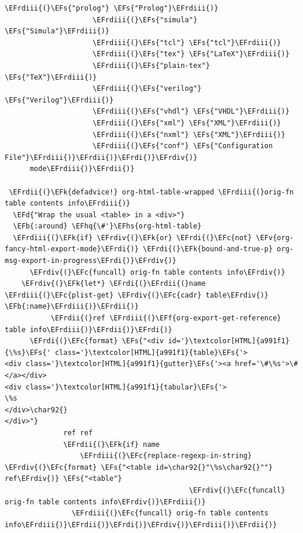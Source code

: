 \documentclass{scrartcl}
\newcommand{\EFk}[1]{\textcolor{EFk}{#1}} %
\newcommand{\EFd}[1]{\textcolor{EFd}{#1}} %
\newcommand{\EFs}[1]{\textcolor{EFs}{#1}} %
\newcommand{\EFb}[1]{\textcolor{EFb}{#1}} %
\newcommand{\EFc}[1]{\textcolor{EFc}{#1}} %
\newcommand{\EFv}[1]{\textcolor{EFv}{#1}} %
\newcommand{\EFf}[1]{\textcolor{EFf}{#1}} %
\newcommand{\EFhq}[1]{#1} %
\newcommand{\EFhs}[1]{#1} %
\newcommand{\EFrdi}[1]{#1} %
\newcommand{\EFrdii}[1]{#1} %
\newcommand{\EFrdiii}[1]{#1} %
\newcommand{\EFrdiv}[1]{#1} %
\begin{document}
\begin{Code}
\begin{Verbatim}[]
                     \EFrdiii{(}\EFs{"prolog"} \EFs{"Prolog"}\EFrdiii{)}
                     \EFrdiii{(}\EFs{"simula"} \EFs{"Simula"}\EFrdiii{)}
                     \EFrdiii{(}\EFs{"tcl"} \EFs{"tcl"}\EFrdiii{)}
                     \EFrdiii{(}\EFs{"tex"} \EFs{"LaTeX"}\EFrdiii{)}
                     \EFrdiii{(}\EFs{"plain-tex"} \EFs{"TeX"}\EFrdiii{)}
                     \EFrdiii{(}\EFs{"verilog"} \EFs{"Verilog"}\EFrdiii{)}
                     \EFrdiii{(}\EFs{"vhdl"} \EFs{"VHDL"}\EFrdiii{)}
                     \EFrdiii{(}\EFs{"xml"} \EFs{"XML"}\EFrdiii{)}
                     \EFrdiii{(}\EFs{"nxml"} \EFs{"XML"}\EFrdiii{)}
                     \EFrdiii{(}\EFs{"conf"} \EFs{"Configuration File"}\EFrdiii{)}\EFrdii{)}\EFrdi{)}\EFrdiv{)}
      mode\EFrdiii{)}\EFrdii{)}

 \EFrdii{(}\EFk{defadvice!} org-html-table-wrapped \EFrdiii{(}orig-fn table contents info\EFrdiii{)}
  \EFd{"Wrap the usual <table> in a <div>"}
  \EFb{:around} \EFhq{\#'}\EFhs{org-html-table}
  \EFrdiii{(}\EFk{if} \EFrdiv{(}\EFk{or} \EFrdi{(}\EFc{not} \EFv{org-fancy-html-export-mode}\EFrdi{)} \EFrdi{(}\EFk{bound-and-true-p} org-msg-export-in-progress\EFrdi{)}\EFrdiv{)}
      \EFrdiv{(}\EFc{funcall} orig-fn table contents info\EFrdiv{)}
    \EFrdiv{(}\EFk{let*} \EFrdi{(}\EFrdii{(}name \EFrdiii{(}\EFc{plist-get} \EFrdiv{(}\EFc{cadr} table\EFrdiv{)} \EFb{:name}\EFrdiii{)}\EFrdii{)}
           \EFrdii{(}ref \EFrdiii{(}\EFf{org-export-get-reference} table info\EFrdiii{)}\EFrdii{)}\EFrdi{)}
      \EFrdi{(}\EFc{format} \EFs{"<div id='}\textcolor[HTML]{a991f1}{\%s}\EFs{' class='}\textcolor[HTML]{a991f1}{table}\EFs{'>
<div class='}\textcolor[HTML]{a991f1}{gutter}\EFs{'><a href='\#\%s'>\#</a></div>
<div class='}\textcolor[HTML]{a991f1}{tabular}\EFs{'>
\%s
</div>\char92{}
</div>"}
              ref ref
              \EFrdii{(}\EFk{if} name
                  \EFrdiii{(}\EFc{replace-regexp-in-string} \EFrdiv{(}\EFc{format} \EFs{"<table id=\char92{}"\%s\char92{}""} ref\EFrdiv{)} \EFs{"<table"}
                                            \EFrdiv{(}\EFc{funcall} orig-fn table contents info\EFrdiv{)}\EFrdiii{)}
                \EFrdiii{(}\EFc{funcall} orig-fn table contents info\EFrdiii{)}\EFrdii{)}\EFrdi{)}\EFrdiv{)}\EFrdiii{)}\EFrdii{)}



\end{Verbatim}
\end{Code}
\end{document}
